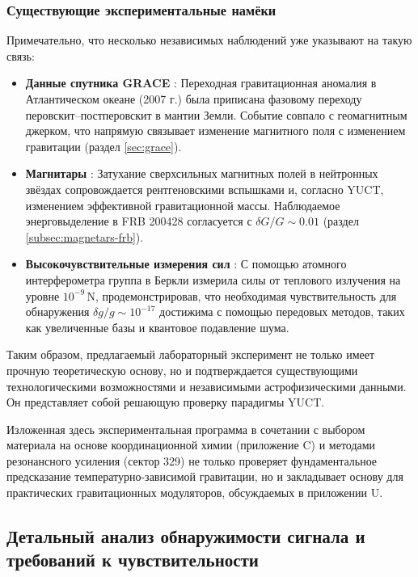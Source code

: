 \documentclass[12pt]{article}
\theoremstyle{remark}
\begin{document}
	\subsubsection{Существующие экспериментальные намёки}
	Примечательно, что несколько независимых наблюдений уже указывают на такую связь:
	\begin{itemize}
		\item \textbf{Данные спутника GRACE} \cite{Rosat2025}: Переходная гравитационная аномалия в Атлантическом океане (2007 г.) была приписана фазовому переходу перовскит–постперовскит в мантии Земли. Событие совпало с геомагнитным джерком, что напрямую связывает изменение магнитного поля с изменением гравитации (раздел \ref{sec:grace}).
		\item \textbf{Магнитары} \cite{Kaspi2017}: Затухание сверхсильных магнитных полей в нейтронных звёздах сопровождается рентгеновскими вспышками и, согласно YUCT, изменением эффективной гравитационной массы. Наблюдаемое энерговыделение в FRB 200428 согласуется с \(\delta G/G \sim 0.01\) (раздел \ref{subsec:magnetars-frb}).
		\item \textbf{Высокочувствительные измерения сил} \cite{Muller2017}: С помощью атомного интерферометра группа в Беркли измерила силы от теплового излучения на уровне \(10^{-9}\,\mathrm{N}\), продемонстрировав, что необходимая чувствительность для обнаружения \(\delta g/g \sim 10^{-17}\) достижима с помощью передовых методов, таких как увеличенные базы и квантовое подавление шума.
	\end{itemize}
	
	Таким образом, предлагаемый лабораторный эксперимент не только имеет прочную теоретическую основу, но и подтверждается существующими технологическими возможностями и независимыми астрофизическими данными. Он представляет собой решающую проверку парадигмы YUCT.
	
	Изложенная здесь экспериментальная программа в сочетании с выбором материала на основе координационной химии (приложение C) и методами резонансного усиления (сектор 329) не только проверяет фундаментальное предсказание температурно-зависимой гравитации, но и закладывает основу для практических гравитационных модуляторов, обсуждаемых в приложении U.
	
	\subsection{Детальный анализ обнаружимости сигнала и требований к чувствительности}
	\label{subsec:signal-detectability}
	
\end{document}
